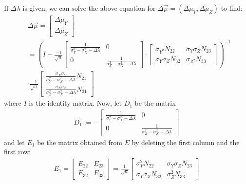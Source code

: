 \documentclass[12pt]{amsart}
\theoremstyle{definition}
\numberwithin{equation}{section}
\numberwithin{equation}{section}
\theoremstyle{remark}
\numberwithin{equation}{section}
\begin{document}
If $\Delta\lambda$ is given, we can solve the above equation for $\Delta\vec{\mu}=(\Delta\mu_Y,\Delta\mu_Z)$ to find:
\begin{align*}
&\Delta\vec{\mu}=\left[
\begin{array}{c}
\Delta\mu_Y\\
\Delta\mu_Z
\end{array}\right]\\
&=
\left(I-
\frac{-1}{\sqrt{n}}\left[
\begin{array}{cc}
\frac{1}{\sigma_Y^2-\sigma_X^2-\Delta\lambda}&0\\
0&\frac{1}{\sigma_Z^2-\sigma_X^2-\Delta\lambda}
\end{array}
\right]
\cdot
\left[
\begin{array}{cc}
\sigma_{Y^2} N_{22}&\sigma_Y\sigma_Z N_{23}\\
\sigma_Y\sigma_Z N_{32}&\sigma_{Z^2} N_{33}
\end{array}\right]\right)^{-1}\\
&\cdot
\frac{-1}{\sqrt{n}}
\left[
\begin{array}{c}
\frac{\sigma_X\sigma_Y}{\sigma_Y^2-\sigma_X^2-\Delta\lambda} N_{21}\\
\frac{\sigma_X\sigma_Z}{\sigma_Z^2-\sigma_X^2-\Delta\lambda} N_{31}
\end{array}
\right]
\end{align*}
where $I$ is the identity matrix. Now, let $D_1$ be the matrix
\begin{align}
D_1:=-\left[
\begin{array}{cc}
\frac{1}{\sigma_Y^2-\sigma_X^2-\Delta\lambda}&0\\
0&\frac{1}{\sigma_Z^2-\sigma_X^2-\Delta\lambda}
\end{array}
\right]
\end{align}
and let $E_1$ be the matrix obtained from $E$ by deleting the first column and the first row:
\begin{align}
E_1=
\left[
\begin{array}{cc}
E_{22}&E_{23}\\
E_{32}&E_{33}
\end{array}\right]=\frac{1}{\sqrt{n}}
\left[
\begin{array}{cc}
\sigma^{2}_{Y}N_{22}&\sigma_Y\sigma_Z N_{23}\\
\sigma_Y\sigma_Z N_{32}&\sigma^{2}_{Z} N_{33}
\end{array}\right]
\end{align}
\end{document}
